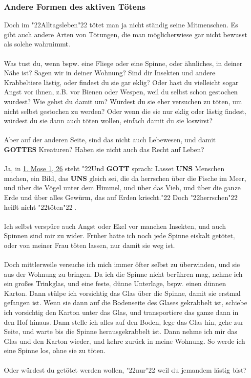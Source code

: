 \documentclass[12pt,a5paper]{article}
\newcommand{\Gottes}[0]{\textbf{GOTTES}}
\newcommand{\Gott}[0]{\textbf{GOTT}}
\newcommand{\Uns}[0]{\textbf{UNS}}
\newcommand{\q}[1]{\char"22{#1}\char"22 }
\begin{document}
	\subsubsection{Andere Formen des aktiven T\"otens}
		Doch im \q{Alltagsleben} t\"otet man ja nicht st\"andig seine Mitmenschen.
		Es gibt auch andere Arten von T\"otungen,
		die man m\"oglicherwiese gar nicht bewusst als solche wahrnimmt.
		\\
		\\
		Was tust du,
		wenn bspw. eine Fliege oder eine Spinne,
		oder \"ahnliches,
		in deiner N\"ahe ist?
		Sagen wir in deiner Wohnung?
		Sind dir Insekten und andere Krabbeltiere l\"astig,
		oder findest du sie gar eklig?
		Oder hast du vielleicht sogar Angst vor ihnen,
		z.B. vor Bienen oder Wespen,
		weil du selbst schon gestochen wurdest?
		Wie gehst du damit um?
		W\"urdest du sie eher versuchen zu t\"oten,
		um nicht selbst gestochen zu werden?
		Oder wenn die sie nur eklig oder l\"astig findest,
		w\"urdest du sie dann auch t\"oten wollen,
		einfach damit du sie loswirst?
		\\
		\\
		Aber auf der anderen Seite,
		sind das nicht auch Lebewesen,
		und damit {\Gottes} Kreaturen?
		Haben sie nicht auch das Recht auf Leben?
		\\
		\\
		Ja,
		in \href{https://www.die-bibel.de/bibeln/online-bibeln/lesen/LU17/GEN.1/1.-Mose-1}
		{1. Mose 1, 26} steht \q{Und {\Gott} sprach:
		Lasset {\Uns} Menschen machen,
		ein Bild,
		das {\Uns} gleich sei,
		die da herrschen \"uber die Fische im Meer,
		und \"uber die V\"ogel unter dem Himmel,
		und \"uber das Vieh,
		und \"uber die ganze Erde und über alles Gew\"urm,
		das auf Erden kriecht.}
		Doch \q{herrschen} hei{\ss}t nicht \q{t\"oten}.
		\\
		\\
		Ich selbst versp\"ure auch Angst oder Ekel vor manchen Insekten,
		und auch Spinnen sind mir zu wider.
		Fr\"uher h\"atte ich noch jede Spinne eiskalt get\"otet,
		oder von meiner Frau t\"oten lassen,
		nur damit sie weg ist.
		\\
		\\
		Doch mittlerweile versuche ich mich immer \"ofter selbst zu \"uberwinden,
		und sie aus der Wohnung zu bringen.
		Da ich die Spinne nicht ber\"uhren mag,
		nehme ich ein gro{\ss}es Trinkglas,
		und eine feste,
		d\"unne Unterlage,
		bspw. einen d\"unnen Karton.
		Dann st\"ulpe ich vorsichtig das Glas \"uber die Spinne,
		damit sie erstmal gefangen ist.
		Wenn sie dann auf die Bodenseite des Glases gekrabbelt ist,
		schiebe ich vorsichtig den Karton unter das Glas,
		und transportiere das ganze dann in den Hof hinaus.
		Dann stelle ich alles auf den Boden,
		lege das Glas hin,
		gehe zur Seite,
		und warte bis die Spinne herausgekrabbelt ist.
		Dann nehme ich mir das Glas und den Karton wieder,
		und kehre zur\"uck in meine Wohnung.
		So werde ich eine Spinne los,
		ohne sie zu t\"oten.
		\\
		\\
		Oder w\"urdest du get\"otet werden wollen,
		\q{nur} weil du jemandem l\"astig bist?
\end{document}
